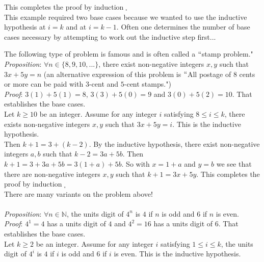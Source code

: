 \documentclass[12pt]{amsart}
\theoremstyle{definition}
\theoremstyle{remark}
\newcommand{\nats}{\mathbb N}
\begin{document}
This completes the proof by induction$\;_{\square}$\\

This example required two base cases because we wanted to use the inductive hypothesis at $i=k$ and at $i=k-1$.  Often one determines the number of base cases necessary by attempting to work out the inductive step first...


\newpage

The following type of problem is famous and is often called a $``$stamp problem."  \\


\emph{Proposition}: $\forall n\in\{8,9,10,...\}$, there exist non-negative integers $x,y$ such that $3x+5y=n$ (an alternative expression of this problem is $``$All postage of $8$ cents or more can be paid with $3$-cent and $5$-cent stamps.")\\

\emph{Proof}:  $3(1)+5(1)=8$, $3(3)+5(0)=9$ and $3(0)+5(2)=10$.  That establishes the base cases.\\

Let $k\geq 10$ be an integer.  Assume for any integer $i$ satisfying $8\leq i\leq k$, there exists non-negative integers $x,y$ such that $3x+5y=i$.  This is the inductive hypothesis.\\

Then $k+1=3+(k-2)$.  By the inductive hypothesis, there exist non-negative integers $a,b$ such that $k-2=3a+5b$.  Then $k+1=3+3a+5b=3(1+a)+5b$.  So with $x=1+a$ and $y=b$ we see that there are non-negative integers $x,y$ such that $k+1=3x+5y$.  This completes the proof by induction$\;_{\square}$\\

There are many variants on the problem above!\\ \\

\emph{Proposition}:  $\forall n\in \nats$, the units digit of $4^n$ is $4$ if $n$ is odd and $6$ if $n$ is even.\\

\emph{Proof}:  $4^1=4$ has a units digit of $4$ and $4^2=16$ has a units digit of $6$.  That establishes the base cases.\\

Let $k\geq 2$ be an integer.  Assume for any integer $i$ satisfying $1\leq i\leq k$, the units digit of $4^i$ is $4$ if $i$ is odd and $6$ if $i$ is even.  This is the inductive hypothesis.\\
\end{document}
